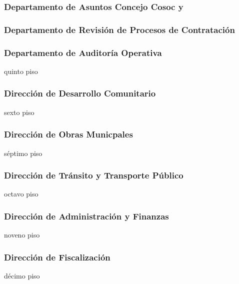 \subsubsection{Departamento de Asuntos Concejo Cosoc y }

\subsubsection{Departamento de Revisión de Procesos de Contratación }

\subsubsection{Departamento de Auditoría Operativa}
 {quinto piso}

\subsubsection{Dirección de Desarrollo Comunitario}
 {sexto piso}

\subsubsection{Dirección de Obras Municpales}
 {séptimo piso}

\subsubsection{Dirección de Tránsito y Transporte Público}
 {octavo piso}

\subsubsection{Dirección de Administración y Finanzas}
 {noveno piso}

\subsubsection{Dirección de Fiscalización}
 {décimo piso}

